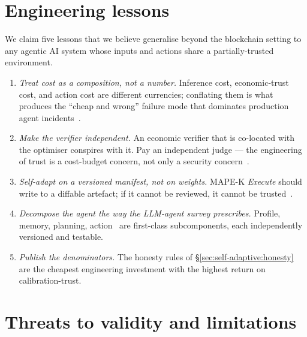 \documentclass[11pt,a4paper]{article}
\begin{document}
\section{Engineering lessons}\label{sec:lessons}

We claim five lessons that we believe generalise beyond the blockchain
setting to any agentic AI system whose inputs and actions share a
partially-trusted environment.

\begin{enumerate}
  \item \emph{Treat cost as a composition, not a number.} Inference
        cost, economic-trust cost, and action cost are different
        currencies; conflating them is what produces the ``cheap and
        wrong'' failure mode that dominates production agent
        incidents~\cite{chen2023frugalgpt,ong2024routellm}.
  \item \emph{Make the verifier independent.} An economic verifier that
        is co-located with the optimiser conspires with it. Pay an
        independent judge --- the engineering of trust is a
        cost-budget concern, not only a security
        concern~\cite{rao2021bittensor,steeves2022incentivizing}.
  \item \emph{Self-adapt on a versioned manifest, not on weights.}
        MAPE-K \emph{Execute} should write to a diffable artefact; if
        it cannot be reviewed, it cannot be trusted~\cite{salehie2009self,weyns2020introduction}.
  \item \emph{Decompose the agent the way the LLM-agent survey
        prescribes.} Profile, memory, planning, action~\cite{wang2024survey}
        are first-class subcomponents, each independently versioned and
        testable.
  \item \emph{Publish the denominators.} The honesty rules of
        \S\ref{sec:self-adaptive:honesty} are the cheapest engineering
        investment with the highest return on calibration-trust.
\end{enumerate}

\section{Threats to validity and limitations}\label{sec:limits}
\label{sec:case-study}%
\label{sec:case-study:prediction-router}%
\label{sec:formal:vloss}%
\end{document}
